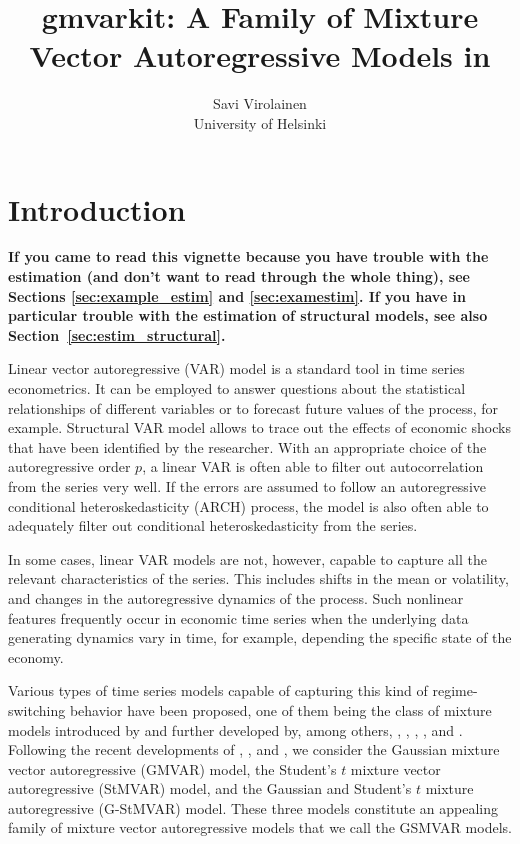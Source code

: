 \documentclass[nojss]{jss}
\author{Savi Virolainen\\ University of Helsinki}
\title{gmvarkit: A Family of Mixture Vector Autoregressive Models in \proglang{R}}
\begin{document}
\section{Introduction}
\textbf{If you came to read this vignette because you have trouble with the estimation (and don't want to read through the whole thing), see Sections \ref{sec:example_estim} and \ref{sec:examestim}. If you have in particular trouble with the estimation of structural models, see also Section~\ref{sec:estim_structural}.}

Linear vector autoregressive (VAR) model is a standard tool in time series econometrics. It can be employed to answer questions about the statistical relationships of different variables or to forecast future values of the process, for example. Structural VAR model allows to trace out the effects of economic shocks that have been identified by the researcher. With an appropriate choice of the autoregressive order $p$, a linear VAR is often able to filter out autocorrelation from the series very well. If the errors are assumed to follow an autoregressive conditional heteroskedasticity (ARCH) process, the model is also often able to adequately filter out conditional heteroskedasticity from the series.

In some cases, linear VAR models are not, however, capable to capture all the relevant characteristics of the series. This includes shifts in the mean or volatility, and changes in the autoregressive dynamics of the process. Such nonlinear features frequently occur in economic time series when the underlying data generating dynamics vary in time, for example, depending the specific state of the economy.

Various types of time series models capable of capturing this kind of regime-switching behavior have been proposed, one of them being the class of mixture models introduced by \cite{Le+Martin+Raftery:1996} and further developed by, among others, \cite{Kalliovirta+Meitz+Saikkonen:2015}, \cite{Kalliovirta+Meitz+Saikkonen:2015}, \cite{Meitz+Preve+Saikkonen:2021}, \cite{Virolainen:2020}, and \cite{Virolainen:2021, Virolainen2:2021}. Following the recent developments of \cite{Kalliovirta+Meitz+Saikkonen:2016}, \cite{Virolainen:2020}, and \cite{Virolainen2:2021}, we consider the Gaussian mixture vector autoregressive (GMVAR) model, the Student's $t$ mixture vector autoregressive (StMVAR) model, and the Gaussian and Student's $t$ mixture autoregressive (G-StMVAR) model. These three models constitute an appealing family of mixture vector autoregressive models that we call the GSMVAR models.
\end{document}
